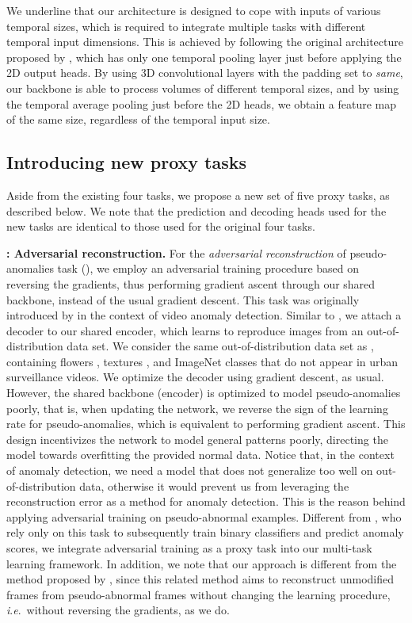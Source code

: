\documentclass[times,twocolumn,final,authoryear]{elsarticle}
\newcommand{\ie}{\textit{i}.\textit{e}.}
\begin{document}
We underline that our architecture is designed to cope with inputs of various temporal sizes, which is required to integrate multiple tasks with different temporal input dimensions. This is achieved by following the original architecture proposed by \cite{Georgescu-CVPR-2021}, which has only one temporal pooling layer just before applying the 2D output heads. By using 3D convolutional layers with the padding set to \emph{same}, our backbone is able to process volumes of different temporal sizes, and by using the temporal average pooling just before the 2D heads, we obtain a feature map of the same size, regardless of the temporal input size.



\subsection{Introducing new proxy tasks}


Aside from the existing four tasks, we propose a new set of five proxy tasks, as described below. We note that the prediction and decoding heads used for the new tasks are identical to those used for the original four tasks.

\noindent
{\bf : Adversarial reconstruction.}
For the \emph{adversarial reconstruction} of pseudo-anomalies task (), we employ an adversarial training procedure based on reversing the gradients, thus performing gradient ascent through our shared backbone, instead of the usual gradient descent. This task was originally introduced by \cite{Georgescu-TPAMI-2021} in the context of video anomaly detection. Similar to \cite{Georgescu-TPAMI-2021}, we attach a decoder to our shared encoder, which learns to reproduce images from an out-of-distribution data set. We consider the same out-of-distribution data set as \cite{Georgescu-TPAMI-2021}, containing flowers \citep{Nilsback-CVPR-2006}, textures \citep{Lazebnik-PAMI-2005}, and ImageNet \citep{Russakovsky-IJCV-2015} classes that do not appear in urban surveillance videos. We optimize the decoder using gradient descent, as usual. However, the shared backbone (encoder) is optimized to model pseudo-anomalies poorly, that is, when updating the network, we reverse the sign of the learning rate for pseudo-anomalies, which is equivalent to performing gradient ascent. This design incentivizes the network to model general patterns poorly, directing the model towards overfitting the provided normal data. Notice that, in the context of anomaly detection, we need a model that does not generalize too well on out-of-distribution data, otherwise it would prevent us from leveraging the reconstruction error as a method for anomaly detection. This is the reason behind applying adversarial training on pseudo-abnormal examples. Different from \cite{Georgescu-TPAMI-2021}, who rely only on this task to subsequently train binary classifiers and predict anomaly scores, we integrate adversarial training as a proxy task into our multi-task learning framework. In addition, we note that our approach is different from the method proposed by \cite{Astrid-BMVC-2021}, since this related method aims to reconstruct unmodified frames from pseudo-abnormal frames without changing the learning procedure, \ie~without reversing the gradients, as we do.
\end{document}
